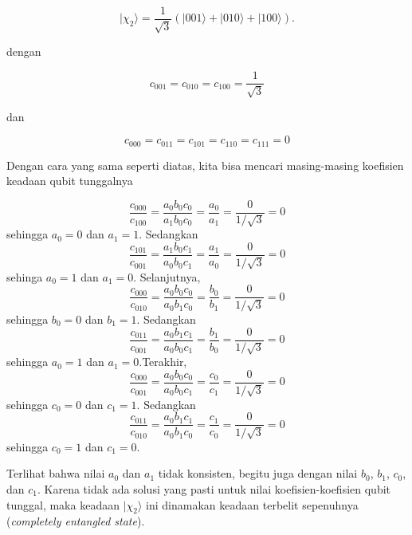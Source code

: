 \begin{equation}
|\chi_2\rangle =
\frac{1}{\sqrt{3}}
\left(
|001\rangle + |010\rangle + |100\rangle
\right) .
\end{equation}

dengan

\begin{equation}
	c_{001}=c_{010}=c_{100}=\frac{1}{\sqrt{3}}
\end{equation}

dan

\begin{equation}
	c_{000}=c_{011}=c_{101}=c_{110}=c_{111}=0
\end{equation}

Dengan cara yang sama seperti diatas, kita bisa mencari masing-masing koefisien keadaan qubit tunggalnya

\begin{equation}
\frac{c_{000}}{c_{100}}=\frac{a_0 b_0 c_0}{a_1 b_0 c_0}=\frac{a_0}{a_1}=\frac{0}{1/\sqrt{3}}=0
\end{equation}
sehingga $a_0=0$ dan $a_1=1$.
Sedangkan
\begin{equation}
	\frac{c_{101}}{c_{001}}=\frac{a_1 b_0 c_1}{a_0 b_0 c_1}=\frac{a_1}{a_0}=\frac{0}{1/\sqrt{3}}=0
\end{equation}
sehinga $a_0=1$ dan $a_1=0$. Selanjutnya,
\begin{equation}
	\frac{c_{000}}{c_{010}}=\frac{a_0 b_0 c_0}{a_0 b_1 c_0}=\frac{b_0}{b_1}=\frac{0}{1/\sqrt{3}}=0
\end{equation}
sehingga $b_0=0$ dan $b_1=1$.
Sedangkan
\begin{equation}
	\frac{c_{011}}{c_{001}}=\frac{a_0 b_1 c_1}{a_0 b_0 c_1}=\frac{b_1}{b_0}=\frac{0}{1/\sqrt{3}}=0
\end{equation}
sehingga $a_0=1$ dan $a_1=0$.Terakhir,
\begin{equation}
	\frac{c_{000}}{c_{001}}=\frac{a_0 b_0 c_0}{a_0 b_0 c_1}=\frac{c_0}{c_1}=\frac{0}{1/\sqrt{3}}=0
\end{equation}
sehingga $c_0=0$ dan $c_1=1$.
Sedangkan
\begin{equation}
	\frac{c_{011}}{c_{010}}=\frac{a_0 b_1 c_1}{a_0 b_1 c_0}=\frac{c_1}{c_0}=\frac{0}{1/\sqrt{3}}=0
\end{equation}
sehingga $c_0=1$ dan $c_1=0$.

Terlihat bahwa nilai $a_0$ dan $a_1$ tidak konsisten, begitu juga dengan nilai $b_0$, $b_1$, $c_0$, dan $c_1$. Karena tidak ada solusi yang pasti untuk nilai koefisien-koefisien qubit tunggal, maka keadaan $|\chi_2\rangle$ ini dinamakan keadaan terbelit sepenuhnya (\textit{completely entangled state}).


